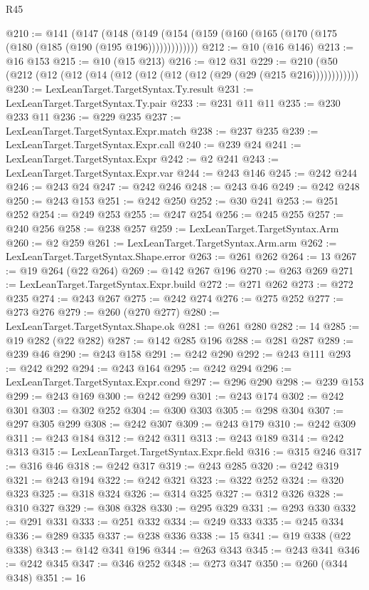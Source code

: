 \begin{lexlean}{R45}
\begin{coremodule}
@210 := @141
    (@147 (@148 (@149 (@154 (@159 (@160 (@165 (@170 (@175 (@180 (@185 (@190 (@195 @196)))))))))))))
@212 := @10 (@16 @146)
@213 := @16 @153
@215 := @10 (@15 @213)
@216 := @12 @31
@229 := @210 (@50 (@212 (@12 (@12 (@14 (@12 (@12 (@12 (@12 (@29 (@29 (@215 @216))))))))))))
@230 := LexLeanTarget.TargetSyntax.Ty.result
@231 := LexLeanTarget.TargetSyntax.Ty.pair
@233 := @231 @11 @11
@235 := @230 @233 @11
@236 := @229 @235
@237 := LexLeanTarget.TargetSyntax.Expr.match
@238 := @237 @235
@239 := LexLeanTarget.TargetSyntax.Expr.call
@240 := @239 @24
@241 := LexLeanTarget.TargetSyntax.Expr
@242 := @2 @241
@243 := LexLeanTarget.TargetSyntax.Expr.var
@244 := @243 @146
@245 := @242 @244
@246 := @243 @24
@247 := @242 @246
@248 := @243 @46
@249 := @242 @248
@250 := @243 @153
@251 := @242 @250
@252 := @30 @241
@253 := @251 @252
@254 := @249 @253
@255 := @247 @254
@256 := @245 @255
@257 := @240 @256
@258 := @238 @257
@259 := LexLeanTarget.TargetSyntax.Arm
@260 := @2 @259
@261 := LexLeanTarget.TargetSyntax.Arm.arm
@262 := LexLeanTarget.TargetSyntax.Shape.error
@263 := @261 @262
@264 := 13
@267 := @19 @264 (@22 @264)
@269 := @142 @267 @196
@270 := @263 @269
@271 := LexLeanTarget.TargetSyntax.Expr.build
@272 := @271 @262
@273 := @272 @235
@274 := @243 @267
@275 := @242 @274
@276 := @275 @252
@277 := @273 @276
@279 := @260 (@270 @277)
@280 := LexLeanTarget.TargetSyntax.Shape.ok
@281 := @261 @280
@282 := 14
@285 := @19 @282 (@22 @282)
@287 := @142 @285 @196
@288 := @281 @287
@289 := @239 @46
@290 := @243 @158
@291 := @242 @290
@292 := @243 @111
@293 := @242 @292
@294 := @243 @164
@295 := @242 @294
@296 := LexLeanTarget.TargetSyntax.Expr.cond
@297 := @296 @290
@298 := @239 @153
@299 := @243 @169
@300 := @242 @299
@301 := @243 @174
@302 := @242 @301
@303 := @302 @252
@304 := @300 @303
@305 := @298 @304
@307 := @297 @305 @299
@308 := @242 @307
@309 := @243 @179
@310 := @242 @309
@311 := @243 @184
@312 := @242 @311
@313 := @243 @189
@314 := @242 @313
@315 := LexLeanTarget.TargetSyntax.Expr.field
@316 := @315 @246
@317 := @316 @46
@318 := @242 @317
@319 := @243 @285
@320 := @242 @319
@321 := @243 @194
@322 := @242 @321
@323 := @322 @252
@324 := @320 @323
@325 := @318 @324
@326 := @314 @325
@327 := @312 @326
@328 := @310 @327
@329 := @308 @328
@330 := @295 @329
@331 := @293 @330
@332 := @291 @331
@333 := @251 @332
@334 := @249 @333
@335 := @245 @334
@336 := @289 @335
@337 := @238 @336
@338 := 15
@341 := @19 @338 (@22 @338)
@343 := @142 @341 @196
@344 := @263 @343
@345 := @243 @341
@346 := @242 @345
@347 := @346 @252
@348 := @273 @347
@350 := @260 (@344 @348)
@351 := 16

\end{coremodule}
\end{lexlean}

